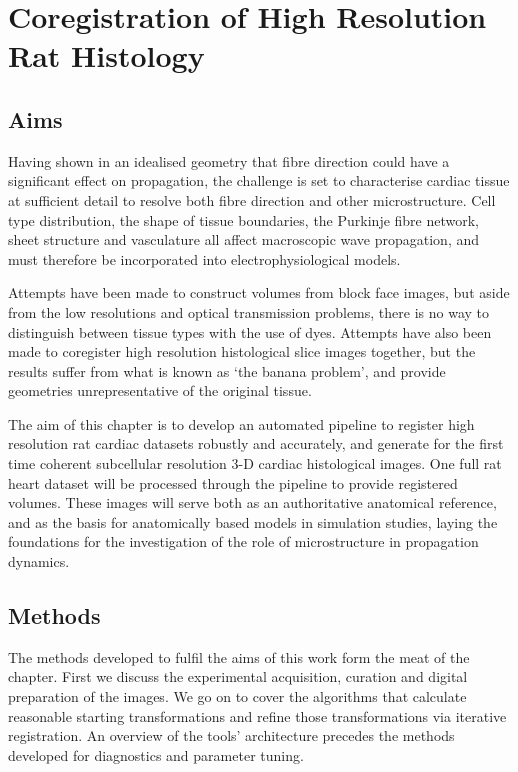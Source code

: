 \chapter{Coregistration of High Resolution Rat Histology}
\dblspace

\section{Aims} %
\label{sec:aims}

  Having shown in an idealised geometry that fibre direction could have a significant effect on propagation, the challenge is set to characterise cardiac tissue at sufficient detail to resolve both fibre direction and other microstructure. Cell type distribution, the shape of tissue boundaries, the Purkinje fibre network, sheet structure and vasculature all affect macroscopic wave propagation, and must therefore be incorporated into electrophysiological models.
	
	Attempts have been made to construct volumes from block face images, but aside from the low resolutions and optical transmission problems, there is no way to distinguish between tissue types with the use of dyes. Attempts have also been made to coregister high resolution histological slice images together, but the results suffer from what is known as `the banana problem', and provide geometries unrepresentative of the original tissue.
	
  The aim of this chapter is to develop an automated pipeline to register high resolution rat cardiac datasets robustly and accurately, and generate for the first time coherent subcellular resolution 3-D cardiac histological images. One full rat heart dataset will be processed through the pipeline to provide registered volumes. These images will serve both as an authoritative anatomical reference, and as the basis for anatomically based models in simulation studies, laying the foundations for the investigation of the role of microstructure in propagation dynamics.
	

\section{Methods} %
\label{sec:methods}
	The methods developed to fulfil the aims of this work form the meat of the chapter. First we discuss the experimental acquisition, curation and digital preparation of the images. We go on to cover the algorithms that calculate reasonable starting transformations and refine those transformations via iterative registration. An overview of the tools' architecture precedes the methods developed for diagnostics and parameter tuning.
	
